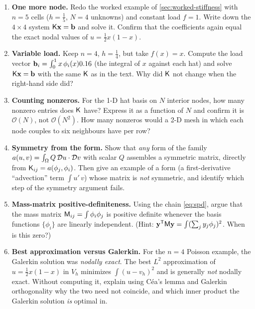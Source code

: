 \exercisessection
\begin{enumerate}[nosep]
  \item \textbf{One more node.} Redo the worked example of
  \cref{sec:worked-stiffness} with $n=5$ cells ($h=\tfrac15$, $N=4$ unknowns) and
  constant load $f=1$. Write down the $4\times4$ system $\mathsf{K}\mathbf{x}=\mathbf{b}$ and solve
  it. Confirm that the coefficients again equal the exact nodal values of
  $u=\tfrac12 x(1-x)$.

  \item \textbf{Variable load.} Keep $n=4$, $h=\tfrac14$, but take
  $f(x)=x$. Compute the load vector $\mathbf{b}_i=\int_0^1 x\,\phi_i(x)0.16$ (the
  integral of $x$ against each hat) and solve $\mathsf{K}\mathbf{x}=\mathbf{b}$ with the same
  $\mathsf{K}$ as in the text. Why did $\mathsf{K}$ not change when the right-hand side
  did?

  \item \textbf{Counting nonzeros.} For the 1-D hat basis on $N$ interior nodes,
  how many nonzero entries does $\mathsf{K}$ have? Express it as a function of $N$ and
  confirm it is $\mathcal{O}(N)$, not $\mathcal{O}(N^2)$. How many nonzeros would
  a 2-D mesh in which each node couples to six neighbours have per row?

  \item \textbf{Symmetry from the form.} Show that \emph{any} form of the family
  $a(u,v)=\int_\Omega Q\,\mathcal{D} u\cdot\mathcal{D} v$ with scalar $Q$ assembles a
  symmetric matrix, directly from $\mathsf{K}_{ij}=a(\phi_j,\phi_i)$. Then give an
  example of a form (a first-derivative ``advection'' term $\int u'\,v$) whose
  matrix is \emph{not} symmetric, and identify which step of the symmetry argument
  fails.

  \item \textbf{Mass-matrix positive-definiteness.} Using the chain
  \cref{eq:spd}, argue that the mass matrix $\mathsf{M}_{ij}=\int\phi_i\phi_j$ is
  positive definite whenever the basis functions $\{\phi_i\}$ are linearly
  independent. (Hint: $\mathbf{y}^{\mathsf T}\mathsf{M}\mathbf{y}=\int(\sum_j y_j\phi_j)^2$. When is
  this zero?)

  \item \textbf{Best approximation versus Galerkin.} For the $n=4$ Poisson
  example, the Galerkin solution was \emph{nodally exact}. The best $L^2$
  approximation of $u=\tfrac12 x(1-x)$ in $V_h$ minimizes $\int(u-v_h)^2$ and is
  generally \emph{not} nodally exact. Without computing it, explain using Céa's
  lemma and Galerkin orthogonality why the two need not coincide, and which inner
  product the Galerkin solution \emph{is} optimal in.


\end{enumerate}
